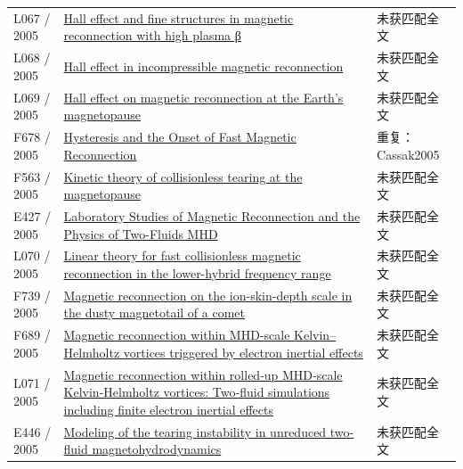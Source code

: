 \begin{longtable}{P{24mm}P{97mm}P{27mm}}
L067 / 2005 & \href{https://doi.org/10.1063/1.1870003}{Hall effect and fine structures in magnetic reconnection with high plasma β} & 未获匹配全文\\

L068 / 2005 & \href{https://doi.org/10.1029/2004ja010675}{Hall effect in incompressible magnetic reconnection} & 未获匹配全文\\

L069 / 2005 & \href{https://doi.org/10.1016/j.jastp.2005.03.013}{Hall effect on magnetic reconnection at the Earth's magnetopause} & 未获匹配全文\\

F678 / 2005 & \href{https://arxiv.org/pdf/physics/0502001}{Hysteresis and the Onset of Fast Magnetic Reconnection} & 重复：Cassak2005\\

F563 / 2005 & \href{https://doi.org/10.1029/2004ja010751}{Kinetic theory of collisionless tearing at the magnetopause} & 未获匹配全文\\

E427 / 2005 & \href{http://ui.adsabs.harvard.edu/abs/2005AGUFMSM11B..02Y/abstract}{Laboratory Studies of Magnetic Reconnection and the Physics of Two-Fluids MHD} & 未获匹配全文\\

L070 / 2005 & \href{https://doi.org/10.1063/1.1900094}{Linear theory for fast collisionless magnetic reconnection in the lower-hybrid frequency range} & 未获匹配全文\\

F739 / 2005 & \href{https://doi.org/10.1063/1.1883184}{Magnetic reconnection on the ion-skin-depth scale in the dusty magnetotail of a comet} & 未获匹配全文\\

F689 / 2005 & \href{https://doi.org/10.1016/j.asr.2005.01.057}{Magnetic reconnection within MHD-scale Kelvin–Helmholtz vortices triggered by electron inertial effects} & 未获匹配全文\\

L071 / 2005 & \href{https://doi.org/10.1029/2005gl023362}{Magnetic reconnection within rolled‐up MHD‐scale Kelvin‐Helmholtz vortices: Two‐fluid simulations including finite electron inertial effects} & 未获匹配全文\\

E446 / 2005 & \href{https://doi.org/10.1134/1.2031627}{Modeling of the tearing instability in unreduced two-fluid magnetohydrodynamics} & 未获匹配全文\\


\end{longtable}
